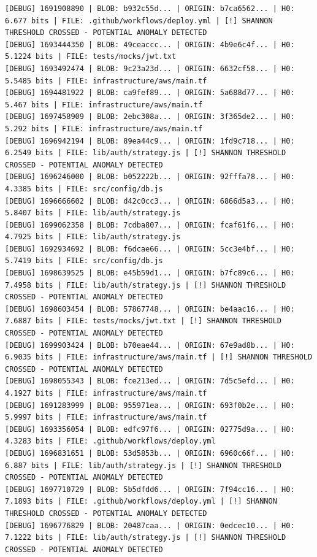 \documentclass[12pt, a4paper, oneside]{report}
\begin{document}
\begin{lstlisting}[basicstyle=\tiny\ttfamily]
[DEBUG] 1691908890 | BLOB: b932c55d... | ORIGIN: b7ca6562... | H0: 6.677 bits | FILE: .github/workflows/deploy.yml | [!] SHANNON THRESHOLD CROSSED - POTENTIAL ANOMALY DETECTED
[DEBUG] 1693444350 | BLOB: 49ceaccc... | ORIGIN: 4b9e6c4f... | H0: 5.1224 bits | FILE: tests/mocks/jwt.txt
[DEBUG] 1693492474 | BLOB: 9c23a23d... | ORIGIN: 6632cf58... | H0: 5.5485 bits | FILE: infrastructure/aws/main.tf
[DEBUG] 1694481922 | BLOB: ca9fef89... | ORIGIN: 5a688d77... | H0: 5.467 bits | FILE: infrastructure/aws/main.tf
[DEBUG] 1697458909 | BLOB: 2ebc308a... | ORIGIN: 3f365de2... | H0: 5.292 bits | FILE: infrastructure/aws/main.tf
[DEBUG] 1696942194 | BLOB: 89ea44c9... | ORIGIN: 1fd9c718... | H0: 6.2549 bits | FILE: lib/auth/strategy.js | [!] SHANNON THRESHOLD CROSSED - POTENTIAL ANOMALY DETECTED
[DEBUG] 1696246000 | BLOB: b052222b... | ORIGIN: 92fffa78... | H0: 4.3385 bits | FILE: src/config/db.js
[DEBUG] 1696666602 | BLOB: d42c0cc3... | ORIGIN: 6866d5a3... | H0: 5.8407 bits | FILE: lib/auth/strategy.js
[DEBUG] 1699062358 | BLOB: 7cdba807... | ORIGIN: fcaf61f6... | H0: 4.7925 bits | FILE: lib/auth/strategy.js
[DEBUG] 1692934692 | BLOB: f6dcae66... | ORIGIN: 5cc3e4bf... | H0: 5.7419 bits | FILE: src/config/db.js
[DEBUG] 1698639525 | BLOB: e45b59d1... | ORIGIN: b7fc89c6... | H0: 7.4958 bits | FILE: lib/auth/strategy.js | [!] SHANNON THRESHOLD CROSSED - POTENTIAL ANOMALY DETECTED
[DEBUG] 1698603454 | BLOB: 57867748... | ORIGIN: be4aac16... | H0: 7.6887 bits | FILE: tests/mocks/jwt.txt | [!] SHANNON THRESHOLD CROSSED - POTENTIAL ANOMALY DETECTED
[DEBUG] 1699903424 | BLOB: b70eae44... | ORIGIN: 67e9ad8b... | H0: 6.9035 bits | FILE: infrastructure/aws/main.tf | [!] SHANNON THRESHOLD CROSSED - POTENTIAL ANOMALY DETECTED
[DEBUG] 1698055343 | BLOB: fce213ed... | ORIGIN: 7d5c5efd... | H0: 4.1927 bits | FILE: infrastructure/aws/main.tf
[DEBUG] 1691283999 | BLOB: 955971ea... | ORIGIN: 693f0b2e... | H0: 5.9997 bits | FILE: infrastructure/aws/main.tf
[DEBUG] 1693356054 | BLOB: edfc97f6... | ORIGIN: 02775d9a... | H0: 4.3283 bits | FILE: .github/workflows/deploy.yml
[DEBUG] 1696831651 | BLOB: 53d5853b... | ORIGIN: 6960c66f... | H0: 6.887 bits | FILE: lib/auth/strategy.js | [!] SHANNON THRESHOLD CROSSED - POTENTIAL ANOMALY DETECTED
[DEBUG] 1697710729 | BLOB: 5b5dfdd6... | ORIGIN: 7f94cc16... | H0: 7.1893 bits | FILE: .github/workflows/deploy.yml | [!] SHANNON THRESHOLD CROSSED - POTENTIAL ANOMALY DETECTED
[DEBUG] 1696776829 | BLOB: 20487caa... | ORIGIN: 0edcec10... | H0: 7.1222 bits | FILE: lib/auth/strategy.js | [!] SHANNON THRESHOLD CROSSED - POTENTIAL ANOMALY DETECTED

\end{lstlisting}
\end{document}
